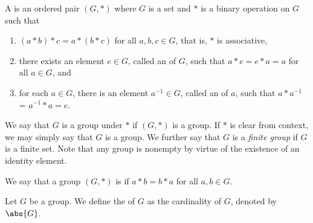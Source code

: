 \begin{defn}
    A  is an ordered pair $(G,\ast)$ where $G$ is a set and $\ast$ is a binary operation on $G$ such that
    \begin{enumerate}
        \item $(a \ast b) \ast c = a \ast (b \ast c)$ for all $a,b,c \in G$, that is, $\ast$ is associative,
        \item there exists an element $e \in G$, called an  of $G$, such that $a \ast e = e \ast a = a$ for all $a \in G$, and
        \item for each $a \in G$, there is an element $a^{-1} \in G$, called an  of $a$, such that $a \ast a^{-1}$ = $a^{-1} \ast a = e$.
    \end{enumerate}
\end{defn}

We say that $G$ is a group under $\ast$ if $(G,\ast)$ is a group. If $\ast$ is clear from context, we may simply say that $G$ is a group. We further say that $G$ is a \emph{finite group} if $G$ is a finite set. Note that any group is nonempty by virtue of the existence of an identity element.

\begin{defn}
    We say that a group $(G,\ast)$ is  if $a \ast b = b \ast a$ for all $a,b \in G$.
\end{defn}


\begin{defn}
    Let $G$ be a group. We define the  of $G$ as the cardinality of $G$, denoted by $\abs{G}$.
\end{defn}

